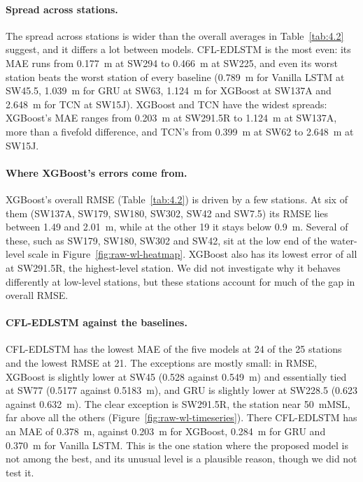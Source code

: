 \paragraph{Spread across stations.}
The spread across stations is wider than the overall averages in
Table~\ref{tab:4.2} suggest, and it differs a lot between models. CFL-EDLSTM is
the most even: its MAE runs from 0.177~m at SW294 to 0.466~m at SW225, and even
its worst station beats the worst station of every baseline (0.789~m for Vanilla
LSTM at SW45.5, 1.039~m for GRU at SW63, 1.124~m for XGBoost at SW137A and
2.648~m for TCN at SW15J). XGBoost and TCN have the widest spreads: XGBoost's MAE
ranges from 0.203~m at SW291.5R to 1.124~m at SW137A, more than a fivefold
difference, and TCN's from 0.399~m at SW62 to 2.648~m at SW15J.

\paragraph{Where XGBoost's errors come from.}
XGBoost's overall RMSE (Table~\ref{tab:4.2}) is driven by a few stations. At six
of them (SW137A, SW179, SW180, SW302, SW42 and SW7.5) its RMSE lies between 1.49
and 2.01~m, while at the other 19 it stays below 0.9~m. Several of these, such as
SW179, SW180, SW302 and SW42, sit at the low end of the water-level scale in
Figure~\ref{fig:raw-wl-heatmap}. XGBoost also has its lowest error of all at
SW291.5R, the highest-level station. We did not investigate why it behaves
differently at low-level stations, but these stations account for much of the
gap in overall RMSE.

\paragraph{CFL-EDLSTM against the baselines.}
CFL-EDLSTM has the lowest MAE of the five models at 24 of the 25 stations and the
lowest RMSE at 21. The exceptions are mostly small: in RMSE, XGBoost is slightly
lower at SW45 (0.528 against 0.549~m) and essentially tied at SW77 (0.5177
against 0.5183~m), and GRU is slightly lower at SW228.5 (0.623 against 0.632~m).
The clear exception is SW291.5R, the station near 50~mMSL, far above all the
others (Figure~\ref{fig:raw-wl-timeseries}). There CFL-EDLSTM has an MAE of
0.378~m, against 0.203~m for XGBoost, 0.284~m for GRU and 0.370~m for Vanilla
LSTM. This is the one station where the proposed model is not among the best,
and its unusual level is a plausible reason, though we did not test it.

